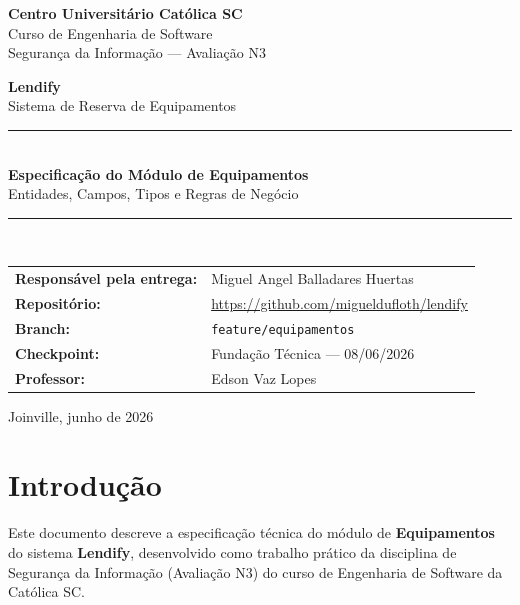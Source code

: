 \documentclass[12pt, a4paper]{article}
\begin{document}
\begin{titlepage}
  \centering
  \vspace*{2cm}
  {\Large\bfseries Centro Universitário Católica SC\\[0.3cm]}
  {\large Curso de Engenharia de Software\\[0.3cm]}
  {\large Segurança da Informação — Avaliação N3\\[2cm]}

  {\huge\bfseries\color{lendifyblue} Lendify\\[0.5cm]}
  {\Large Sistema de Reserva de Equipamentos\\[0.5cm]}
  \rule{\linewidth}{0.5pt}\\[0.5cm]
  {\LARGE\bfseries Especificação do Módulo de Equipamentos\\[0.3cm]}
  {\large Entidades, Campos, Tipos e Regras de Negócio\\[2cm]}
  \rule{\linewidth}{0.5pt}\\[1cm]

  \begin{tabular}{ll}
    \textbf{Responsável pela entrega:} & Miguel Angel Balladares Huertas \\
    \textbf{Repositório:}              & \url{https://github.com/migueldufloth/lendify} \\
    \textbf{Branch:}                   & \texttt{feature/equipamentos} \\
    \textbf{Checkpoint:}               & Fundação Técnica — 08/06/2026 \\
    \textbf{Professor:}                & Edson Vaz Lopes \\
  \end{tabular}

  \vfill
  {\large Joinville, junho de 2026}
\end{titlepage}

\tableofcontents
\newpage
{}
\setcounter{page}{1}
\hypersetup{pageanchor=true}

\section{Introdução}

Este documento descreve a especificação técnica do módulo de \textbf{Equipamentos} do
sistema \textbf{Lendify}, desenvolvido como trabalho prático da disciplina de Segurança
da Informação (Avaliação N3) do curso de Engenharia de Software da Católica SC.
\end{document}
